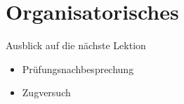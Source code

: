 












\section{Organisatorisches}
\BlueSectionSlide







\begin{frame}{Ausblick auf die nächste Lektion}
\begin{itemize}
    \item[\textbullet] Prüfungsnachbesprechung
    \item[\textbullet] Zugversuch
\end{itemize}
\end{frame}



